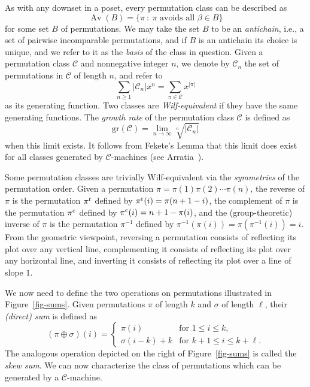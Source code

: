 \documentclass[10pt]{article}
\theoremstyle{plain}
\theoremstyle{definition}
\newcommand{\st}{\::\:}
\newcommand{\Av}{\operatorname{Av}}
\newcommand{\C}{\mathcal{C}}
\newcommand{\gr}{\mathrm{gr}}
\begin{document}
As with any downset in a poset, every permutation class can be described as
\[
	\Av(B)=\{\pi\st\pi\mbox{ avoids all $\beta\in B$}\}
\]
for some set $B$ of permutations. We may take the set $B$ to be an \emph{antichain}, i.e., a set of pairwise incomparable permutations, and if $B$ is an antichain its choice is unique, and we refer to it as the \emph{basis} of the class in question. Given a permutation class $\C$ and nonnegative integer $n$, we denote by $\C_n$ the set of permutations in $\C$ of length $n$, and refer to
\[
	\sum_{n\ge 1} |\C_n|x^n=\sum_{\pi\in\C} x^{|\pi|}
\]
as its generating function. Two classes are \emph{Wilf-equivalent} if they have the same generating functions. The \emph{growth rate} of the permutation class $\C$ is defined as
\[
	\gr(\C)=\lim_{n\rightarrow\infty} \sqrt[n]{|\C_n|}
\]
when this limit exists. It follows from Fekete's Lemma that this limit does exist for all classes generated by $\C$-machines (see Arratia~\cite{arratia:on-the-stanley-:}).

Some permutation classes are trivially Wilf-equivalent via the \emph{symmetries} of the permutation order. Given a permutation $\pi = \pi(1)\pi(2)\cdots\pi(n)$, the reverse of $\pi$ is the permutation $\pi^{\textrm r}$ defined by $\pi^{\textrm r}(i) = \pi(n+1-i)$, the complement of $\pi$ is the permutation $\pi^{\textrm c}$ defined by $\pi^{\textrm c}(i) = n + 1 - \pi(i)$, and the (group-theoretic) inverse of $\pi$ is the permutation $\pi^{-1}$ defined by $\pi^{-1}(\pi(i)) = \pi(\pi^{-1}(i)) = i$. From the geometric viewpoint, reversing a permutation consists of reflecting its plot over any vertical line, complementing it consists of reflecting its plot over any horizontal line, and inverting it consists of reflecting its plot over a line of slope $1$.

We now need to define the two operations on permutations illustrated in Figure~\ref{fig-sums}. Given permutations $\pi$ of length $k$ and $\sigma$ of length $\ell$, their \emph{(direct) sum} is defined as
\[
    (\pi\oplus\sigma)(i)
    =
    \left\{\begin{array}{ll}
    \pi(i)&\mbox{for $1\le i\le k$},\\
    \sigma(i-k)+k&\mbox{for $k+1\le i\le k+\ell$}.
    \end{array}\right.
\]
The analogous operation depicted on the right of Figure~\ref{fig-sums} is called the \emph{skew sum}. We can now characterize the class of permutations which can be generated by a $\C$-machine.
\end{document}
